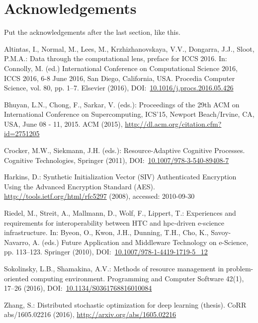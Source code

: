 \documentclass{superfri}
\begin{document}
\section*{Acknowledgements}
Put the acknowledgements after the last section, like this.

\openaccess




\begin{thebibliography}{9}
	
	Altintas, I., Normal, M., Lees, M., Krzhizhanovskaya, V.V., Dongarra, J.J., Sloot, P.M.A.: Data through the computational lens, preface for ICCS 2016. In: Connolly, M. (ed.) International Conference on Computational Science 2016, ICCS 2016, 6-8 June 2016, San
	Diego, California, USA. Procedia Computer Science, vol. 80, pp. 1--7. Elsevier (2016),  DOI:~\href{http://dx.doi.org/10.1016/j.procs.2016.05.426}{10.1016/j.procs.2016.05.426}
	
	Bhuyan, L.N., Chong, F., Sarkar, V. (eds.): Proceedings of the 29th ACM on International Conference on Supercomputing, ICS'15, Newport Beach/Irvine, CA, USA, June 08 - 11, 2015. ACM (2015), \url{http://dl.acm.org/citation.cfm?id=2751205}

	Crocker, M.W., Siekmann, J.H. (eds.): Resource-Adaptive Cognitive Processes. Cognitive Technologies, Springer (2011), DOI:~\href{http://dx.doi.org/10.1007/978-3-540-89408-7}{10.1007/978-3-540-89408-7}
	
	Harkins, D.: Synthetic Initialization Vector (SIV) Authenticated Encryption Using the Advanced Encryption Standard (AES). \url{http://tools.ietf.org/html/rfc5297} (2008), accessed: 2010-09-30
	
	Riedel, M., Streit, A., Mallmann, D., Wolf, F., Lippert, T.: Experiences and requirements for interoperability between HTC and hpc-driven e-science infrastructure. In: Byeon, O., Kwon, J.H., Dunning, T.H., Cho, K., Savoy-Navarro, A. (eds.) Future Application and Middleware Technology on e-Science, pp. 113--123. Springer (2010), DOI:~\href{http://dx.doi.org/10.1007/978-1-4419-1719-5\_12}{10.1007/978-1-4419-1719-5\_12}		
	
	Sokolinsky, L.B., Shamakina, A.V.: Methods of resource management in problem-oriented computing environment. Programming and Computer Software 42(1), 17--26 (2016),  DOI:~\href{http://dx.doi.org/10.1134/S0361768816010084}{10.1134/S0361768816010084}
	
	Zhang, S.: Distributed stochastic optimization for deep learning (thesis). CoRR abs/1605.02216 (2016), \url{http://arxiv.org/abs/1605.02216}

\end{thebibliography}

\end{document}
